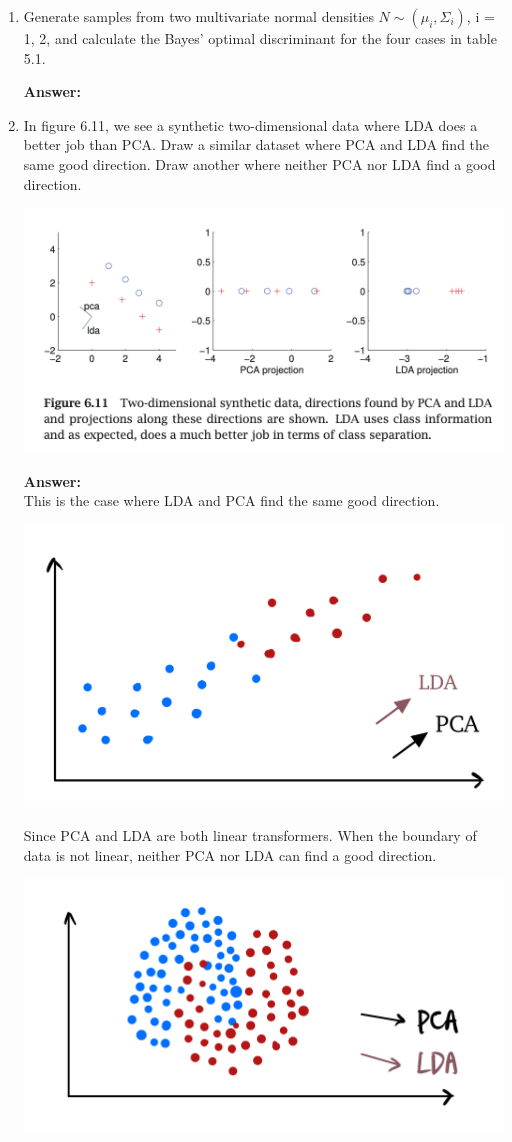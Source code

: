 \documentclass{article}
\begin{document}
\begin{enumerate}
    \item  Generate samples from two multivariate normal densities $N\sim(\mu_i, \Sigma_i)$, i = 1, 2, and calculate the Bayes’ optimal discriminant for the four cases in table 5.1. %
    
    \textbf{Answer:} \\

    \item  In figure 6.11, we see a synthetic two-dimensional data where LDA does a better job than PCA. Draw a similar dataset where PCA and LDA find the same good direction. Draw another where neither PCA nor LDA find a good direction.\\ %
    \begin{center}
        \includegraphics[width=0.8\linewidth]{figure 6-11.png}
    \end{center}
    
    \textbf{Answer:} \\
    This is the case where LDA and PCA find the same good direction.
    \begin{center}
        \includegraphics[width=0.6\linewidth]{q7-1.png}
    \end{center}

    Since PCA and LDA are both linear transformers. When the boundary of data is not linear, neither PCA nor LDA can find a good direction.
    \begin{center}
        \includegraphics[width=0.6\linewidth]{q7-2.png}
    \end{center}


\end{enumerate}
\end{document}

